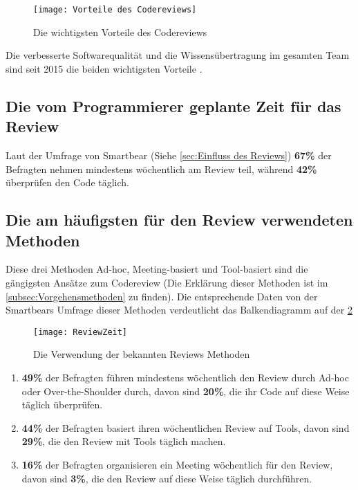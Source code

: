 \begin{figure}[H]
	\centering
	\texttt{[image: Vorteile des Codereviews]}
	\caption[Vorteile des Codereviews]{Die wichtigsten Vorteile des Codereviews\\ \cite{smartbear}}
	\label{fig:Vorteile des Codereviews}
\end{figure}

Die verbesserte Softwarequalität und die Wissensübertragung im gesamten Team sind seit 2015 die beiden wichtigsten Vorteile \cite{smartbear}.

\subsection{Die vom Programmierer geplante Zeit für das Review}
\label{subsec:reviewerZeit}

Laut der Umfrage von Smartbear (Siehe \cref{sec:Einfluss des Reviews}) \textbf{67\%} der Befragten nehmen mindestens wöchentlich am Review teil, während \textbf{42\%} überprüfen den Code täglich.

\subsection{Die am häufigsten für den Review verwendeten Methoden}
\label{subsec:Die am häufigsten verwendete Methoden}

Diese drei Methoden Ad-hoc, Meeting-basiert und Tool-basiert sind die gängigsten Ansätze zum Codereview (Die Erklärung dieser Methoden ist im \cref{subsec:Vorgehensmethoden} zu finden).
Die entsprechende Daten von der Smartbears Umfrage \cite{smartbear} dieser Methoden verdeutlicht das Balkendiagramm auf der \cref{fig:ReviewZeit} 

\begin{figure}[H]
	\centering
	\texttt{[image: ReviewZeit]}
	\caption[Die Verwendung der bekannten Reviews Methoden]{Die Verwendung der bekannten Reviews Methoden\\\cite{smartbear}}
	\label{fig:ReviewZeit}
\end{figure}

\begin{enumerate}
	\item \textbf{49\%} der Befragten führen mindestens wöchentlich den Review durch Ad-hoc oder Over-the-Shoulder durch, davon sind \textbf{20\%}, die ihr Code auf diese Weise 					täglich überprüfen.
	\item \textbf{44\%} der Befragten basiert ihren wöchentlichen Review auf Tools, davon sind \textbf{29\%}, die den Review mit Tools täglich machen.
	\item \textbf{16\%} der Befragten organisieren ein Meeting wöchentlich für den Review, davon sind \textbf{3\%}, die den Review auf diese Weise täglich durchführen.
\end{enumerate}


